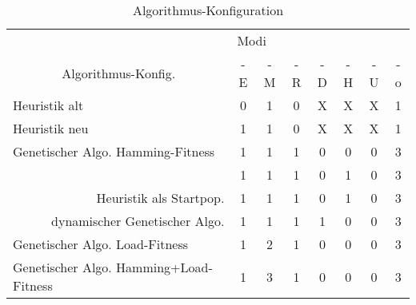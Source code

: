 	\begin{table}[htp]
		\centering
		\begin{tabular}{ccccccccc}
			\multicolumn{2}{l}{}                 & \multicolumn{7}{|l}{Modi}                                                               \\ 
			\multicolumn{2}{c}{Algorithmus-Konfig.}  & \multicolumn{1}{|c}{-E} & \multicolumn{1}{c}{-M} & \multicolumn{1}{c}{-R} & \multicolumn{1}{c}{-D} & \multicolumn{1}{c}{-H} & \multicolumn{1}{c}{-U} & \multicolumn{1}{c}{-o} \\ 
			\hline
		\multicolumn{2}{l}{Heuristik alt}  & \multicolumn{1}{|c}{0} & \multicolumn{1}{c}{1} & \multicolumn{1}{c}{0} & \multicolumn{1}{c}{X} & \multicolumn{1}{c}{X} & \multicolumn{1}{c}{X} & \multicolumn{1}{c}{1} \\
		\multicolumn{2}{l}{Heuristik neu}  & \multicolumn{1}{|c}{1} & \multicolumn{1}{c}{1} & \multicolumn{1}{c}{0} & \multicolumn{1}{c}{X} & \multicolumn{1}{c}{X} & \multicolumn{1}{c}{X} & \multicolumn{1}{c}{1} \\ 
		\multicolumn{2}{l}{Genetischer Algo. Hamming-Fitness}  & \multicolumn{1}{|c}{1} & \multicolumn{1}{c}{1} & \multicolumn{1}{c}{1} & \multicolumn{1}{c}{0} & \multicolumn{1}{c}{0} & \multicolumn{1}{c}{0} & \multicolumn{1}{c}{3} \\
			\multicolumn{2}{r}{}  & \multicolumn{1}{|c}{1} & \multicolumn{1}{c}{1} & \multicolumn{1}{c}{1} & \multicolumn{1}{c}{0} & \multicolumn{1}{c}{1} & \multicolumn{1}{c}{0} & \multicolumn{1}{c}{3} \\
			\multicolumn{2}{r}{Heuristik als Startpop.}  & \multicolumn{1}{|c}{1} & \multicolumn{1}{c}{1} & \multicolumn{1}{c}{1} & \multicolumn{1}{c}{0} & \multicolumn{1}{c}{1} & \multicolumn{1}{c}{0} & \multicolumn{1}{c}{3} \\
			\multicolumn{2}{r}{dynamischer Genetischer Algo.}  & \multicolumn{1}{|c}{1} & \multicolumn{1}{c}{1} & \multicolumn{1}{c}{1} & \multicolumn{1}{c}{1} & \multicolumn{1}{c}{0} & \multicolumn{1}{c}{0} & \multicolumn{1}{c}{3} \\
		\multicolumn{2}{l}{Genetischer Algo. Load-Fitness}  & \multicolumn{1}{|c}{1} & \multicolumn{1}{c}{2} & \multicolumn{1}{c}{1} & \multicolumn{1}{c}{0} & \multicolumn{1}{c}{0} & \multicolumn{1}{c}{0} & \multicolumn{1}{c}{3} \\ 
		\multicolumn{2}{l}{Genetischer Algo. Hamming+Load-Fitness}  & \multicolumn{1}{|c}{1} & \multicolumn{1}{c}{3} & \multicolumn{1}{c}{1} & \multicolumn{1}{c}{0} & \multicolumn{1}{c}{0} & \multicolumn{1}{c}{0} & \multicolumn{1}{c}{3}                     
		\end{tabular}
		\newline
		\caption{Algorithmus-Konfiguration}
	\end{table}

